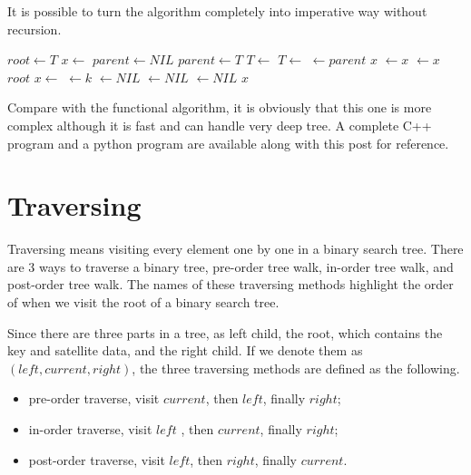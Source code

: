 \documentclass{article}
\begin{document}
It is possible to turn the algorithm completely into imperative way
without recursion. 

\begin{algorithmic}[1]
  \State $root \gets T$
  \State $x \gets$ 
  \State $parent \gets NIL$
    \State $parent \gets T$
      \State $T \gets $ 
    \Else
      \State $T \gets $ 
    \EndIf
  \EndWhile
  \State {} $\gets parent$
   
    \State \Return $x$
    \State {} $\gets x$
  \Else
    \State {} $\gets x$
  \EndIf
  \State \Return $root$
\EndFunction
\Statex
{}
  \State $x \gets $ 
  \State {} $ \gets k$
  \State {} $ \gets NIL$
  \State {} $ \gets NIL$
  \State {} $ \gets NIL$
  \State \Return $x$
\EndFunction
\end{algorithmic}

Compare with the functional algorithm, it is obviously that this one
is more complex although it is fast and can handle very deep tree. A 
complete C++ program and a python program are available along with this
post for reference.

\section{Traversing}

Traversing means visiting every element one by one in a binary 
search tree. There are 3 ways to traverse a binary tree, pre-order tree walk, 
in-order tree walk, and post-order tree walk. The names of these
traversing methods highlight the order of when we visit the root
of a binary search tree.

Since there are three parts in a tree, as left child, the root, which
contains the key and satellite data, and the right child. If we denote
them as $(left, current, right)$, the three traversing methods are defined 
as the following.

\begin{itemize}
\item pre-order traverse, visit $current$, then $left$, finally $right$;
\item in-order traverse, visit $left$ , then $current$, finally $right$;
\item post-order traverse, visit $left$, then $right$, finally $current$.
\end{itemize}
\end{document}
